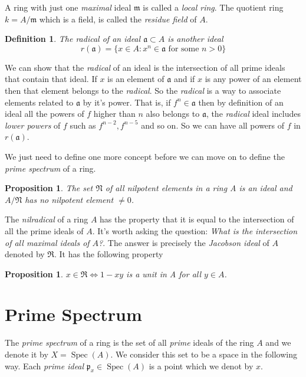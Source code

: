 \documentclass[]{report}
\newtheorem{prop}[theorem]{Proposition}
\newtheorem{defn}[theorem]{Definition}
\DeclareMathOperator\Spec{Spec}
\begin{document}
A ring with just one \textit{maximal} ideal $\mathfrak{m}$ is called a \textit{local ring}. The quotient ring $k = A/\mathfrak{m}$ which is a field, is called the \textit{residue field} of $A$. 

\begin{defn}
    The radical of an ideal $\mathfrak{a}\subset A$ is another ideal 
    $$r(\mathfrak{a}) = \{x\in A: x^n\in \mathfrak{a} \text{ for some } n>0\}$$
\end{defn}

We can show that the \textit{radical} of an ideal is the intersection of all prime ideals that contain that ideal. If $x$ is an element of $\mathfrak{a}$ and if $x$ is any power of an element then that element belongs to the \textit{radical}. So the \textit{radical} is a way to associate elements related to $\mathfrak{a}$ by it's power. That is, if $f^n\in \mathfrak{a}$ then by definition of an ideal all the powers of $f$ higher than $n$ also belongs to $\mathfrak{a}$, the \textit{radical} ideal includes \textit{lower powers} of $f$ such as $f^{n-2}, f^{n-5}$ and so on. So we can have all powers of $f$ in $r(\mathfrak{a})$. 

We just need to define one more concept before we can move on to define the \textit{prime spectrum} of a ring. 

\begin{prop}
    The set $\mathfrak{N}$ of all nilpotent elements in a ring A is an ideal and $A/\mathfrak{N}$ has no nilpotent element $\neq 0$. \cite{atiyah1}
\end{prop}

The \textit{nilradical} of a ring $A$ has the property that it is equal to the intersection of all the prime ideals of $A$. It's worth asking the question: \textit{What is the intersection of all maximal ideals of $A$?}. The answer is precisely the \textit{Jacobson ideal} of $A$ denoted by $\mathfrak{R}$. It has the following property

\begin{prop}
    $x\in \mathfrak{R} \Leftrightarrow 1-xy$ is a unit in A for all $y\in A$. \cite{atiyah1}
\end{prop}

\section{Prime Spectrum}

The \textit{prime spectrum} of a ring is the set of all \textit{prime} ideals of the ring $A$ and we denote it by $X = \Spec(A)$. We consider this set to be a space in the following way. Each \textit{prime ideal} $\mathfrak{p}_x \in \Spec(A)$ is a point which we denot by $x$.
\end{document}
